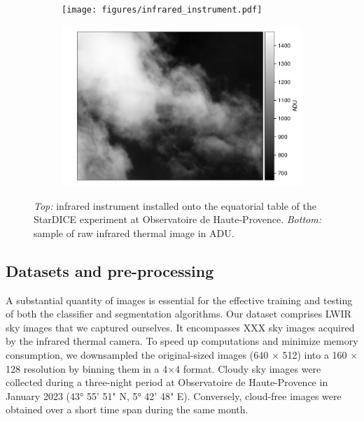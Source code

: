 \documentclass[amt, article]{copernicus}
\begin{document}
\begin{figure}[t]
    \centering
    \begin{subfigure}[b]{0.9\hsize}
        \texttt{[image: figures/infrared\_instrument.pdf]}
    \end{subfigure}
    \hfill
    \begin{subfigure}[b]{\hsize}
        \includegraphics[width=\textwidth]{figures/sample_sky_image.pdf}
    \end{subfigure}
    \caption{\textit{Top:} infrared instrument installed onto the equatorial table of the StarDICE experiment at Observatoire de Haute-Provence. \textit{Bottom:} sample of raw infrared thermal image in ADU.}
    \label{fig:infrared_system}
\end{figure}

\subsection{Datasets and pre-processing}

A substantial quantity of images is essential for the effective training and testing of both the classifier and segmentation algorithms. Our dataset comprises LWIR sky images that we captured ourselves. It encompasses XXX sky images acquired by the infrared thermal camera. To speed up computations and minimize memory consumption, we downsampled the original-sized images (640 $\times$ 512) into a 160 $\times$ 128 resolution by binning them in a 4$\times$4 format. Cloudy sky images were collected during a three-night period at Observatoire de Haute-Provence in January 2023 (43° 55' 51" N, 5° 42' 48" E). Conversely, cloud-free images were obtained over a short time span during the same month.
\end{document}
